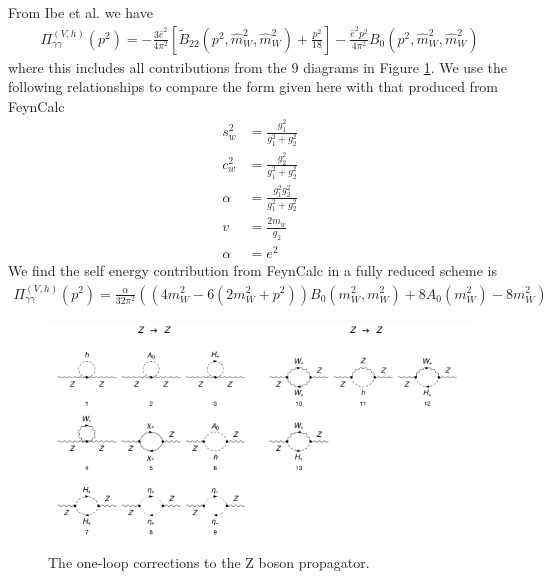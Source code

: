 \documentclass[11pt]{article}
\begin{document}
From Ibe et al. we have
\begin{align}
\Pi_{\gamma \gamma}^{(V, h)}(p^2) =
-\frac{3 \hat{e}^2}{4\pi^2}
\left[ \tilde{B}_{22}(p^2, \hat{m}_W^2, \hat{m}_W^2) + \frac{p^2}{18} \right]
-\frac{\hat{e}^2 p^2}{4\pi^2} B_0(p^2, \hat{m}_W^2, \hat{m}_W^2)
\end{align}
where this includes all contributions from the 9 diagrams in Figure \ref{fig:gammagamma}.  We use the following relationships to compare the form given here with that produced from FeynCalc
\begin{align}
s_w^2&=\frac{g_1^2}{g_1^2+g_2^2}\\
c_w^2&=\frac{g_2^2}{g_1^2+g_2^2}\\
\alpha&=\frac{g_1^2g_2^2}{g_1^2+g_2^2}\\
v&=\frac{2m_w}{g_2}\\
\alpha&=e^2
\end{align}
We find the self energy contribution from FeynCalc in a fully reduced scheme is
\begin{align}
\Pi_{\gamma \gamma}^{(V, h)}(p^2) = \frac{\alpha}{32\pi^2} \left( \left(4m_W^2-6(2m_W^2+p^2)\right)B_0(m_W^2,m_W^2)+8 A_0(m_W^2)-8m_W^2\right)
\end{align}


\begin{figure}[h!]
\center
\includegraphics[width=0.5\textwidth]{diagrams_V[2]_1_1.pdf}\includegraphics[width=0.5\textwidth]{diagrams_V[2]_1_2.pdf}
\caption{The one-loop corrections to the Z boson propagator.}\label{fig:gammagamma}
\end{figure}
\end{document}
